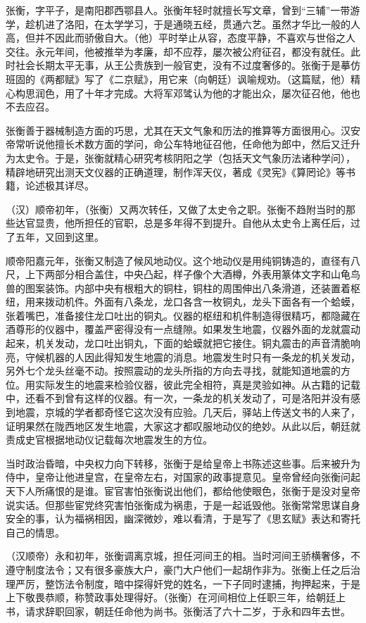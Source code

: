 \documentclass[12pt,UTF-8,openany,a4]{ctexbook}
\begin{document}
\begin{large}\yiwen
    
    张衡，字平子，是南阳郡西鄂县人。张衡年轻时就擅长写文章，曾到“三辅”一带游学，趁机进了洛阳，在太学学习，于是通晓五经，贯通六艺。虽然才华比一般的人高，但并不因此而骄傲自大。（他）平时举止从容，态度平静，不喜欢与世俗之人交往。永元年间，他被推举为孝廉，却不应荐，屡次被公府征召，都没有就任。此时社会长期太平无事，从王公贵族到一般官吏，没有不过度奢侈的。张衡于是摹仿班固的《两都赋》写了《二京赋》，用它来（向朝廷）讽喻规劝。（这篇赋，他）精心构思润色，用了十年才完成。大将军邓骘认为他的才能出众，屡次征召他，他也不去应召。
    
    张衡善于器械制造方面的巧思，尤其在天文气象和历法的推算等方面很用心。汉安帝常听说他擅长术数方面的学问，命公车特地征召他，任命他为郎中，然后又迁升为太史令。于是，张衡就精心研究考核阴阳之学（包括天文气象历法诸种学问），精辟地研究出测天文仪器的正确道理，制作浑天仪，著成《灵宪》《算罔论》等书籍，论述极其详尽。
    
    （汉）顺帝初年，（张衡）又两次转任，又做了太史令之职。张衡不趋附当时的那些达官显贵，他所担任的官职，总是多年得不到提升。自他从太史令上离任后，过了五年，又回到这里。
    
    顺帝阳嘉元年，张衡又制造了候风地动仪。这个地动仪是用纯铜铸造的，直径有八尺，上下两部分相合盖住，中央凸起，样子像个大酒樽，外表用篆体文字和山龟鸟兽的图案装饰。内部中央有根粗大的铜柱，铜柱的周围伸出八条滑道，还装置着枢纽，用来拨动机件。外面有八条龙，龙口各含一枚铜丸，龙头下面各有一个蛤蟆，张着嘴巴，准备接住龙口吐出的铜丸。仪器的枢纽和机件制造得很精巧，都隐藏在酒尊形的仪器中，覆盖严密得没有一点缝隙。如果发生地震，仪器外面的龙就震动起来，机关发动，龙口吐出铜丸，下面的蛤蟆就把它接住。铜丸震击的声音清脆响亮，守候机器的人因此得知发生地震的消息。地震发生时只有一条龙的机关发动，另外七个龙头丝毫不动。按照震动的龙头所指的方向去寻找，就能知道地震的方位。用实际发生的地震来检验仪器，彼此完全相符，真是灵验如神。从古籍的记载中，还看不到曾有这样的仪器。有一次，一条龙的机关发动了，可是洛阳并没有感到地震，京城的学者都奇怪它这次没有应验。几天后，驿站上传送文书的人来了，证明果然在陇西地区发生地震，大家这才都叹服地动仪的绝妙。从此以后，朝廷就责成史官根据地动仪记载每次地震发生的方位。
    
    当时政治昏暗，中央权力向下转移，张衡于是给皇帝上书陈述这些事。后来被升为侍中，皇帝让他进皇宫，在皇帝左右，对国家的政事提意见。皇帝曾经向张衡问起天下人所痛恨的是谁。宦官害怕张衡说出他们，都给他使眼色，张衡于是没对皇帝说实话。但那些宦党终究害怕张衡成为祸患，于是一起诋毁他。张衡常常思谋自身安全的事，认为福祸相因，幽深微妙，难以看清，于是写了《思玄赋》表达和寄托自己的情思。
    
    （汉顺帝）永和初年，张衡调离京城，担任河间王的相。当时河间王骄横奢侈，不遵守制度法令；又有很多豪族大户，豪门大户他们一起胡作非为。张衡上任之后治理严厉，整饬法令制度，暗中探得奸党的姓名，一下子同时逮捕，拘押起来，于是上下敬畏恭顺，称赞政事处理得好。（张衡）在河间相位上任职三年，给朝廷上书，请求辞职回家，朝廷任命他为尚书。张衡活了六十二岁，于永和四年去世。
    

\end{large}
\end{document}
